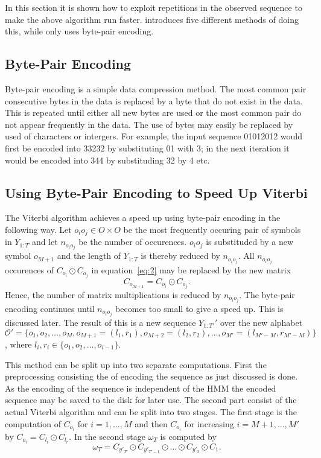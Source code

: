 In this section it is shown how to exploit repetitions in the observed sequence
to make the above algorithm run faster. \citet{lifshits2009speeding} introduces
five different methods of doing this, while \citet{sand2013ziphmmlib} only uses
byte-pair encoding.

\subsection{Byte-Pair Encoding}

Byte-pair encoding is a simple data compression method. The most common pair
consecutive bytes in the data is replaced by a byte that do not exist in the
data. This is repeated until either all new bytes are used or the most common
pair do not appear frequently in the data. The use of bytes may easily be
replaced by used of characters or intergers. For example, the input sequence
01012012 would first be encoded into 33232 by substituting 01 with 3; in the
next iteration it would be encoded into 344 by substituding 32 by 4 etc.

\subsection{Using Byte-Pair Encoding to Speed Up Viterbi}
\label{sec:using-byte-pair}

The Viterbi algorithm achieves a speed up using byte-pair encoding in the
following way. Let $o_i o_j \in O \times O$ be the most frequently occuring
pair of symbols in $Y_{1:T}$ and let $n_{o_i o_j}$ be the number of
occurences. $o_i o_j$ is substituded by a new symbol $o_{M + 1}$ and the length
of $Y_{1:T}$ is thereby reduced by $n_{o_i o_j}$. All $n_{o_i o_j}$ occurences
of $C_{o_i} \odot C_{o_j}$ in equation~\eqref{eq:2} may be replaced by the new
matrix
\begin{equation}
  \label{eq:7}
  C_{o_{M + 1}} = C_{o_i} \odot C_{o_j}.
\end{equation}
Hence, the number of matrix multiplications is reduced by $n_{o_i o_j}$. The
byte-pair encoding continues until $n_{o_i o_j}$ becomes too small to give a
speed up. This is discussed later. The result of this is a new sequence
$Y_{1:T'}'$ over the new alphabet
$\mathcal{O}' = \{o_1, o_2, \dots, o_M, o_{M + 1} = (l_1, r_1), o_{M + 2} =
(l_2, r_2), \dots, o_{M'} = (l_{M' - M}, r_{M' - M}) \}$,
where $l_i, r_i \in \{ o_1, o_2, \dots, o_{i - 1} \}$.

This method can be split up into two separate computations. First the
preprocessing consisting the of encoding the sequence as just discussed is
done. As the encoding of the sequence is independent of the HMM the encoded
sequence may be saved to the disk for later use. The second part consist of the
actual Viterbi algorithm and can be split into two stages. The first stage is
the computation of $C_{o_i}$ for $i = 1, \dots, M$ and then $C_{o_i}$ for
increasing $i = M + 1, \dots, M'$ by $C_{o_i} = C_{l_i} \odot C_{l_r}$. In the
second stage $\omega_T$ is computed by
\begin{equation}
  \label{eq:3}
  \omega_T = C_{y'_{T'}} \odot C_{y'_{T'-1}} \odot \dots \odot C_{y'_2} \odot C_1.
\end{equation}

